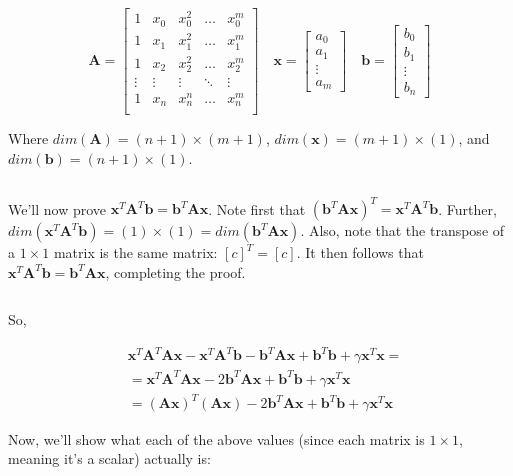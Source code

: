 \documentclass{article}
\newcommand{\x}{\mathbf{x}}
\newcommand{\A}{\mathbf{A}}
\newcommand{\B}{\mathbf{b}} %
\begin{document}
\begin{equation*}
    \A =
    \begin{bmatrix}
        1 & x_0 & x_0 ^2 & \ldots & x_0^m \\
        1 & x_1 & x_1 ^2 & \ldots & x_1^m \\
        1 & x_2 & x_2 ^2 & \ldots & x_2^m \\
        \vdots & \vdots & \vdots & \ddots & \vdots \\
        1 & x_n & x_n ^n & \ldots & x_n^m \\
    \end{bmatrix}
    \quad
    \x =
    \begin{bmatrix}
        a_0\\
        a_1\\
        \vdots\\
        a_m
    \end{bmatrix}
    \quad
    \B =
    \begin{bmatrix}
        b_0\\
        b_1\\
        \vdots\\
        b_n
    \end{bmatrix}
\end{equation*}

Where $dim(\A)=(n+1)\times(m+1)$, $dim(\x)=(m+1)\times(1)$, and $dim(\B)=(n+1)\times(1)$.

$ $ %

We'll now prove $\x^T\A^T\B = \B^T\A\x$. Note first that $(\B^T\A\x)^T=\x^T\A^T\B$. Further, $dim(\x^T\A^T\B) = (1) \times (1) = dim(\B^T\A\x)$. Also, note that the transpose of a $1 \times 1$ matrix is the same matrix: $[c]^T=[c]$. It then follows that $\x^T\A^T\B = \B^T\A\x$, completing the proof.

$ $ %

So,

\begin{equation} \label{eqn:rls_prod}
\begin{split}
    &\x^T \A^T \A\x - \x^T \A^T \B - \B^T \A\x + \B^T \B + \gamma \x^T \x = \\ 
    & = \x^T \A^T \A\x -2 \B^T \A\x + \B^T \B + \gamma \x^T \x\\
    & = (\A\x)^T(\A\x) -2 \B^T \A\x + \B^T \B + \gamma \x^T \x
\end{split}
\end{equation}

Now, we'll show what each of the above values (since each matrix is $1 \times 1$, meaning it's a scalar) actually is:
\end{document}

